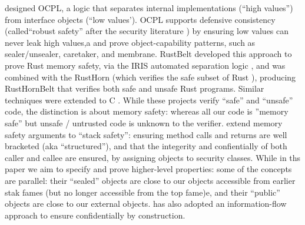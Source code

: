 \citet{ddd}  designed OCPL, a logic
that %
separates internal implementations (``high values'')
from interface objects
(``low values'). %
OCPL supports defensive
consistency %
(called``robust safety'' after the
security literature \cite{Bengtson})
by ensuring
low values can never leak high values,a %
and 
prove %
object-capability patterns, such as
sealer/unsealer, caretaker, and membrane.
%
%
RustBelt \cite{RustBelt18}
developed this approach to prove Rust memory safety,
via the IRIS automated
separation logic \cite{iris-jfp2018},
%
%
and was combined 
with the RustHorn  %
(which verifies the safe subset of Rust \cite{RustHorn-toplas2021}),
producing RustHornBelt \cite{RustHornBelt-pldi2022} that verifies
both safe and unsafe Rust programs.%
Similar techniques were extended to C \cite{RefinedC-pldi2021}.
While these projects 
verify ``safe'' and ``unsafe'' code, 
%
the distinction is about memory safety:%
%
%
%
whereas all our code is ''memory safe''
but unsafe / untrusted code
is unknown to the verifier.
\citet{stack-safety-csf2023} extend memory safety arguments to ``stack
safety'': ensuring method calls and returns are well bracketed (aka
``structured''), and that the integerity and confientially of both
caller and callee are ensured, by assigning objects to security
classes. While in ths paper we aim to specify and prove higher-level
properties: some of the concepts are parallel: their ``sealed''
objects are close to our objects accessible from earlier stak fames
(but no longer accessible from the top fame)e, and their ``public''
objects are close to our external objects.
%
%
\citet{schaeferCbC} has also adopted
an information-flow approach to ensure confidentially by construction.

